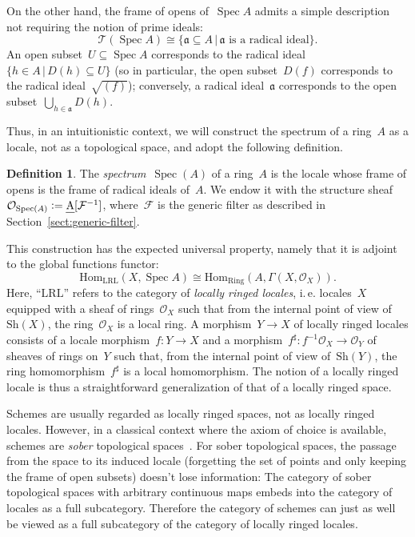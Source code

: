 \documentclass[10pt,reqno,a4paper]{amsbook}
\makeatletter
\theoremstyle{definition}
\newtheorem{defn}{Definition}[section]
\theoremstyle{plain}
\theoremstyle{remark}
\newcommand{\F}{\mathcal{F}}
\renewcommand{\O}{\mathcal{O}}
\newcommand{\T}{\mathcal{T}}
\newcommand{\aaa}{\mathfrak{a}}
\newcommand{\Hom}{\mathrm{Hom}}
\let\oldul\ul
\renewcommand{\ul}[1]{\text{\oldul{$#1$}}}
\newcommand{\Sh}{\mathrm{Sh}}
\newcommand{\Ring}{\mathrm{Ring}}
\newcommand{\LRL}{\mathrm{LRL}}
\DeclareMathOperator{\Spec}{Spec}
\newcommand{\Open}{\T}
\newcommand{\?}{\,{:}\,}
\renewcommand{\_}{\mathpunct{.}\,}
\newcommand{\ie}{i.\,e.\@\xspace}
\newcommand{\stacksproject}[1]{\cite[{\href{http://stacks.math.columbia.edu/tag/#1}{Tag~#1}}]{stacks-project}}
\newcommand{\defeq}{\vcentcolon=}
\makeatother
\begin{document}
On the other hand, the frame of opens of~$\Spec A$ admits a simple
description not requiring the notion of prime ideals:
\[ \Open(\Spec A) \cong \{ \aaa \subseteq A \,|\,
  \text{$\aaa$ is a radical ideal} \}. \]
An open subset~$U \subseteq \Spec A$ corresponds to the radical ideal~$\{ h \in
A \,|\, D(h) \subseteq U \}$ (so in particular, the open subset~$D(f)$
corresponds to the radical ideal~$\sqrt{(f)}$); conversely, a radical ideal~$\aaa$
corresponds to the open subset~$\bigcup_{h \in \aaa} D(h)$.

Thus, in an intuitionistic context, we will construct the spectrum of a ring~$A$
as a locale, not as a topological space, and adopt the following definition.

\begin{defn}\label{defn:spectrum-as-a-locale}
The \emph{spectrum}~$\Spec(A)$ of a ring~$A$ is the locale whose frame of
opens is the frame of radical ideals of~$A$. We endow it with the structure
sheaf~$\O_{\Spec(A)} \defeq \ul{A}[\F^{-1}]$, where~$\F$ is the generic filter
as described in Section~\ref{sect:generic-filter}.\end{defn}

This construction has the expected
universal property, namely that it is adjoint to the global functions functor:
\[ \Hom_{\LRL}(X, \Spec A) \cong \Hom_{\Ring}(A, \Gamma(X,\O_X)). \]
Here, ``$\LRL$'' refers to the category of \emph{locally ringed locales}, \ie
locales~$X$ equipped with a sheaf of rings~$\O_X$ such that from the internal point of
view of~$\Sh(X)$, the ring~$\O_X$ is a local ring. A morphism~$Y \to X$ of
locally ringed locales consists of a locale morphism~$f : Y \to X$ and a
morphism~$f^\sharp : f^{-1} \O_X \to \O_Y$ of sheaves of rings on~$Y$ such that, from the
internal point of view of~$\Sh(Y)$, the ring homomorphism~$f^\sharp$ is a local
homomorphism. The notion of a locally ringed locale is thus a straightforward
generalization of that of a locally ringed space.

Schemes are usually regarded as locally ringed spaces, not
as locally ringed locales. However, in a classical
context where the axiom of choice is available, schemes are \emph{sober}
topological spaces~\stacksproject{01IS}. For sober topological spaces, the passage from the space to
its induced locale (forgetting the set of points and only keeping the frame of
open subsets) doesn't lose information: The category of sober topological
spaces with arbitrary continuous maps embeds into the category of locales as a
full subcategory. Therefore the category of schemes can just as well be viewed
as a full subcategory of the category of locally ringed locales.
\end{document}
